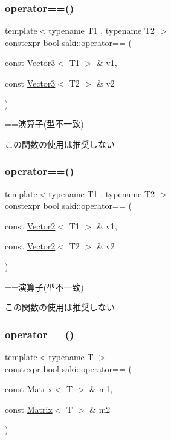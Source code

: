 \subsubsection{\texorpdfstring{operator==()}{operator==()}\hspace{0.1cm}{\footnotesize\ttfamily [8/11]}}
{\footnotesize\ttfamily template$<$typename T1 , typename T2 $>$ \\
constexpr bool saki\+::operator== (\begin{DoxyParamCaption}\item[{const \mbox{\hyperlink{classsaki_1_1_vector3}{Vector3}}$<$ T1 $>$ \&}]{v1,  }\item[{const \mbox{\hyperlink{classsaki_1_1_vector3}{Vector3}}$<$ T2 $>$ \&}]{v2 }\end{DoxyParamCaption})}



==演算子(型不一致) 

この関数の使用は推奨しない \mbox{\label{namespacesaki_a033d4b861140a6c00a8cb56ad71d463a}} 
\subsubsection{\texorpdfstring{operator==()}{operator==()}\hspace{0.1cm}{\footnotesize\ttfamily [9/11]}}
{\footnotesize\ttfamily template$<$typename T1 , typename T2 $>$ \\
constexpr bool saki\+::operator== (\begin{DoxyParamCaption}\item[{const \mbox{\hyperlink{classsaki_1_1_vector2}{Vector2}}$<$ T1 $>$ \&}]{v1,  }\item[{const \mbox{\hyperlink{classsaki_1_1_vector2}{Vector2}}$<$ T2 $>$ \&}]{v2 }\end{DoxyParamCaption})}



==演算子(型不一致) 

この関数の使用は推奨しない \mbox{\label{namespacesaki_acecebb6fed194d4ca5b6f123b5ed7563}} 
\subsubsection{\texorpdfstring{operator==()}{operator==()}\hspace{0.1cm}{\footnotesize\ttfamily [10/11]}}
{\footnotesize\ttfamily template$<$typename T $>$ \\
constexpr bool saki\+::operator== (\begin{DoxyParamCaption}\item[{const \mbox{\hyperlink{classsaki_1_1_matrix}{Matrix}}$<$ T $>$ \&}]{m1,  }\item[{const \mbox{\hyperlink{classsaki_1_1_matrix}{Matrix}}$<$ T $>$ \&}]{m2 }\end{DoxyParamCaption})}



